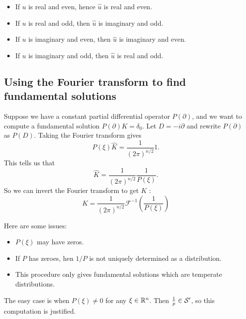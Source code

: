 \begin{itemize}
    \item If $u$ is real and even, hence $\hat u$ is real and even.
    \item If $u$ is real and odd, then $\hat u$ is imaginary and odd.
    \item If $u$ is imaginary and even, then $\hat u$ is imaginary and even.
    \item If $u$ is imaginary and odd, then $\hat u$ is real and odd.
\end{itemize}

\subsection{Using the Fourier transform to find fundamental solutions}

Suppose we have a constant partial differential operator $P(\partial)$, and we want to compute a fundamental solution $P(\partial)K = \delta_0$. Let $D=-i\partial$ and rewrite $P(\partial)$ as $P(D)$. Taking the Fourier transform gives 
\[
    P(\xi)\hat K = \frac{1}{(2\pi)^{n/2}}1.
\]
This tells us that 
\[
    \hat K = \frac{1}{(2\pi)^{n/2}}\frac{1}{P(\xi)}.
\]
So we can invert the Fourier transform to get $K$ :
$$
K=\frac{1}{(2 \pi)^{n / 2}} \mathcal{F}^{-1}\left(\frac{1}{P(\xi)}\right)
$$

Here are some issues:
\begin{itemize}
    \item $P(\xi)$ may have zeros.
    \item If $P$ has zeroes, hen $1/P$ is not uniquely determined as a distribution.
    \item This procedure only gives fundamental solutions which are temperate distributions.
\end{itemize}

The easy case is when $P(\xi)\neq 0$ for any $\xi \in \mathbb{R}^n$. Then $\frac 1 p \in \mathcal{S}'$, so this computation is justified.


